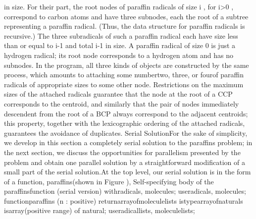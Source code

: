 \LmthEndeqn[]\EndInlEqn[] in size. For
their part, the root nodes of paraffin radicals of size %
\InlEqn[]\LmthEqn[]i
\LmthEndeqn[]\EndInlEqn[], for \InlEqn[]\LmthEqn[]i>0
\LmthEndeqn[]\EndInlEqn[], correspond to carbon
atoms and have three subnodes, each the root of a subtree representing
a paraffin radical. (Thus, the data structure for paraffin radicals
is recursive.) The three subradicals of such a paraffin radical each
have size less than or equal to \InlEqn[]\LmthEqn[]i-1
\LmthEndeqn[]\EndInlEqn[] and total %
\InlEqn[]\LmthEqn[]i-1
\LmthEndeqn[]\EndInlEqn[] in size. A paraffin radical of size 0 is just
a hydrogen radical; its root node corresponds to a hydrogen atom and
has no subnodes. In the program, all three kinds of objects are constructed
by the same process, which amounts to attaching some number\EmDash[]two,
three, or four\EmDash[]of paraffin radicals of appropriate sizes to
some other node. Restrictions on the maximum sizes of the attached
radicals guarantee that the node at the root of a CCP corresponds
to the centroid, and similarly that the pair of nodes immediately
descendent from the root of a BCP always correspond to the adjacent
centroids; this property, together with the lexicographic ordering
of the attached radicals, guarantees the avoidance of duplicates.%
\Endpara[]
\DivLiv[]\HdMinLiv[]Serial Solution\HdMinEndiv[]
\Para[]For the sake of simplicity, we develop in this section a completely
serial solution to the paraffins problem; in the next section, we
discuss the opportunities for parallelism presented by the problem
and obtain one parallel solution by a straightforward modification
of a small part of the serial solution.\Endpara[]
\Para[]At the top level, our serial solution is in the form of a function,
\tyxffmxmono[]paraffins\tyxffmxendmono[] (shown in Figure %
),
\FgBlock[]
\Parbox[]
Self-specifying body
of the \tyxffmxmono[]paraffins\tyxffmxendmono[] function (serial version)%
\FgEndcap[]
\Comp[]\tyxtstxbf[]with\tyxtstxendbf[] radicals, molecules;
\tyxtstxbf[]use\tyxtstxendbf[]  radicals, molecules;
\tyxtstxbf[]function\tyxtstxendbf[] paraffins (n : positive) %
\tyxtstxbf[]return\tyxtstxendbf[] array\Symuns[]of\Symuns[]molecule\Symuns[]lists %
\tyxtstxbf[]is\tyxtstxendbf[]
   \tyxtstxbf[]type\tyxtstxendbf[] array\Symuns[]of\Symuns[]naturals %
\tyxtstxbf[]is\tyxtstxendbf[] \tyxtstxbf[]array\tyxtstxendbf[] (positive %
\tyxtstxbf[]range\tyxtstxendbf[] \Symlt[]\Symgt[]) \tyxtstxbf[]of%
\tyxtstxendbf[] natural;
   \tyxtstxbf[]use\tyxtstxendbf[] radical\Symuns[]lists, molecule\Symuns[]lists;
